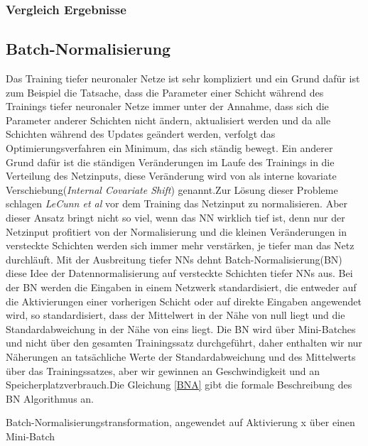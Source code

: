 \documentclass[12pt,a4paper]{scrartcl}
\numberwithin{equation}{section}
\begin{document}
\subsubsection{Vergleich Ergebnisse}
\subsection{Batch-Normalisierung}
Das Training tiefer neuronaler Netze ist sehr kompliziert und ein Grund dafür ist zum Beispiel die Tatsache, dass die Parameter einer Schicht während des Trainings tiefer neuronaler Netze immer unter der Annahme, dass sich die Parameter anderer Schichten nicht ändern, aktualisiert werden und da alle Schichten während des Updates geändert werden, verfolgt das Optimierungsverfahren ein Minimum, das sich ständig bewegt. Ein anderer Grund dafür ist die ständigen Veränderungen im Laufe des Trainings in die Verteilung des Netzinputs, diese Veränderung wird von \cite{bactchnormalisation} als interne kovariate Verschiebung(\textit{Internal Covariate Shift}) genannt.Zur Lösung dieser Probleme schlagen \textit{LeCunn et al}\cite{LeCun} vor dem Training das Netzinput zu normalisieren. Aber dieser Ansatz bringt nicht so viel, wenn das \ac{NN} wirklich tief ist, denn nur der Netzinput profitiert von der Normalisierung und die kleinen Veränderungen in versteckte Schichten werden sich immer mehr verstärken, je tiefer man das Netz durchläuft. Mit der Ausbreitung tiefer \acsp{NN} dehnt Batch-Normalisierung(BN)\cite{bactchnormalisation} diese Idee der Datennormalisierung auf versteckte Schichten tiefer \acsp{NN} aus. Bei der BN werden die Eingaben in einem Netzwerk standardisiert, die entweder auf die Aktivierungen einer vorherigen Schicht oder auf direkte Eingaben angewendet wird, so standardisiert, dass der Mittelwert in der Nähe von null liegt und die Standardabweichung in der Nähe von eins liegt. Die BN wird über Mini-Batches und nicht über den gesamten Trainingssatz durchgeführt, daher enthalten wir nur Näherungen an tatsächliche Werte der Standardabweichung und des Mittelwerts über das Trainingssatzes, aber wir gewinnen an Geschwindigkeit und an Speicherplatzverbrauch.Die Gleichung \eqref{BNA} gibt die formale Beschreibung des BN Algorithmus an.
\begin{center}
	 Batch-Normalisierungstransformation, angewendet auf Aktivierung x über einen Mini-Batch
\end{center}
\end{document}
